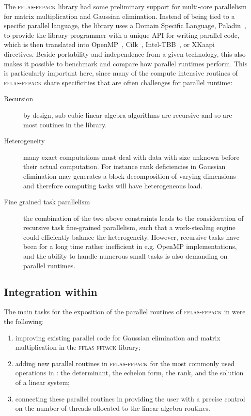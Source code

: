 \documentclass{deliverablereport}
\newcommand{\fflasffpack}{\textsc{fflas-ffpack}\xspace}
\begin{document}
The \fflasffpack library had some preliminary support for multi-core parallelism for matrix
multiplication and Gaussian elimination.
Instead of being tied to a specific parallel language, the library uses a Domain Specific Language, Paladin~\cite{paladin},
to provide the library programmer with a unique API for writing parallel code, which is then translated into 
OpenMP~\cite{openmp}, Cilk~\cite{cilk}, Intel-TBB~\cite{tbb}, or XKaapi~\cite{xkaapi} directives. Beside portability and
independence from
a given technology, this also makes it possible to benchmark and compare how parallel runtimes perform. This is
particularly important here, since many of the compute intensive routines of \fflasffpack share specificities that are
often challenges for parallel runtime:
\begin{description}
\item[Recursion] by design, sub-cubic linear algebra algorithms are recursive and so are most routines in the
  library.
\item[Heterogeneity] many exact computations must deal with data with size unknown before their actual computation. For
  instance rank deficiencies in Gaussian elimination may generates a block decomposition of varying dimensions and
  therefore computing tasks will have heterogeneous load.
\item[Fine grained task parallelism] the combination of the two above constraints leads to the consideration of recursive task
  fine-grained parallelism, such that a work-stealing engine could efficiently balance the heterogeneity. However,
  recursive tasks have been for a long time rather inefficient in e.g. OpenMP implementations, and the ability to handle
  numerous small tasks is also demanding on parallel runtimes.
\end{description}

\subsection{Integration within \SageMath}

The main tasks for the exposition of the parallel routines of \fflasffpack in \SageMath were the following:
\begin{enumerate}
\item improving existing parallel code for Gaussian elimination and matrix multiplication in the \fflasffpack library;
\item adding new parallel routines in \fflasffpack for the most commonly used operations in \SageMath: the determinant,
  the echelon form, the rank, and the solution of a linear system;
\item connecting these parallel routines in \SageMath  providing  the user
  with a precise control on the number of threads allocated to the linear algebra routines. 
\end{enumerate}
\end{document}
